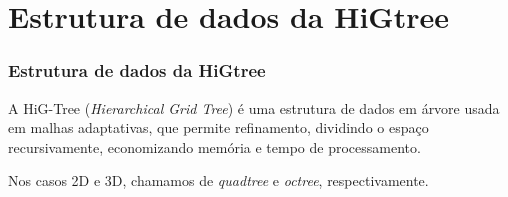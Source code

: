 \documentclass[../main/main.tex]{subfiles}
\begin{document}
	
	
	
	
\section{Estrutura de dados da HiGtree}



\begin{frame}
	\frametitle{Estrutura de dados da HiGtree}
\end{frame}




\begin{frame}
	\begin{block}{}
		A HiG-Tree (\textit{Hierarchical Grid Tree}) é uma estrutura de dados em árvore usada em malhas adaptativas, que permite refinamento, dividindo o espaço recursivamente, economizando memória e tempo de processamento.
	\end{block}
	
	\begin{block}{}
		Nos casos 2D e 3D, chamamos de \textit{quadtree} e \textit{octree}, respectivamente.
	\end{block}
\end{frame}
\end{document}
